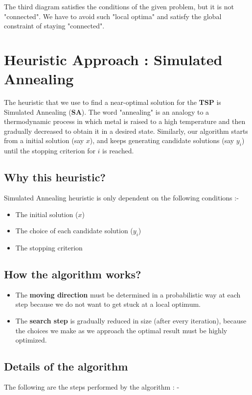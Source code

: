 \documentclass[conference]{IEEEtran}
\begin{document}
The third diagram satisfies the conditions of the given problem, but it is not "connected". We have to avoid such "local optima" and satisfy the global constraint of staying "connected". 

\section{\textbf{Heuristic Approach : Simulated Annealing}}
The heuristic that we use to find a near-optimal solution for the \textbf{TSP} is Simulated Annealing (\textbf{SA}). The word "annealing" is an analogy to a thermodynamic process in which metal is raised to a high temperature and then gradually decreased to obtain it in a desired state. Similarly, our algorithm starts from a initial solution (say $x$), and keeps generating candidate solutions (say $y_i$) until the stopping criterion for $i$ is reached. 

\subsection{Why this heuristic?}\label{AA}
Simulated Annealing heuristic is only dependent on the following conditions :- 

\begin{itemize}
    \item{The initial solution ($x$)}
    \item{The choice of each candidate solution ($y_i$)}
    \item{The stopping criterion}
\end{itemize}

\subsection{How the algorithm works?}
\begin{itemize}
    \item The \textbf{moving direction} must be determined in a probabilistic way at each step because we do not want to get stuck at a local optimum.
    \item The \textbf{search step} is gradually reduced in size (after every iteration), because the choices we make as we approach the optimal result must be highly optimized. 
\end{itemize}

\subsection{Details of the algorithm }
The following are the steps performed by the algorithm : - 
\end{document}
